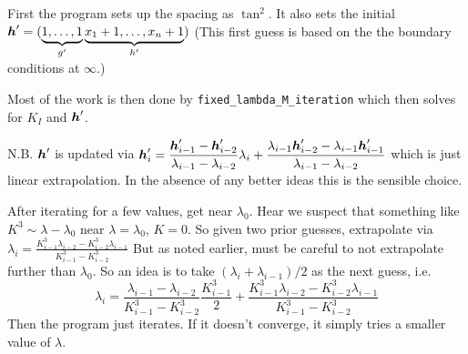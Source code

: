 First the program sets up the spacing as $\tan^2$. It also sets the
initial $\boldsymbol{h}'= (\underbrace{1,\dots,1}_{g'} \underbrace{x_1+1, \dots,
x_n+1}_{h'})$ (This first guess is based on the
the boundary conditions at $\infty$.)

Most of the work is then done by \texttt{fixed\_lambda\_M\_iteration}
which then solves for $K_I$ and $\boldsymbol{h}'$. 

N.B. $\boldsymbol{h}'$ is updated via $\displaystyle \boldsymbol{h}_i' = \frac{\boldsymbol{h}_{i-1}'
-\boldsymbol{h}_{i-2}'}{\lambda_{i-1} - \lambda_{i-2}} \lambda_i + 
\frac{\lambda_{i-1}\boldsymbol{h}_{i-2}'-\lambda_{i-1}\boldsymbol{h}_{i-1}'}
{\lambda_{i-1} - \lambda_{i-2}} $ which is just linear extrapolation.
In the absence of any better ideas this is the sensible choice.

After iterating for a few values, get near $\lambda_0$. Hear we suspect
that something like $K^3 \sim \lambda-\lambda_0$ near $\lambda=\lambda_0$,
$K=0$. So given two prior guesses, extrapolate via 
$\displaystyle \lambda_i = \frac{K_{i-1}^3\lambda_{i-2} - K_{i-2}^3
\lambda_{i-1}}{K_{i-1}^3-K_{i-2}^3}$ But as noted earlier, must be careful
to not extrapolate further than $\lambda_0$. So an idea is to take $(\lambda_i
+ \lambda_{i-1})/2$ as the next guess, i.e. 
\[\lambda_i = 
\frac{\lambda_{i-1} - \lambda_{i-2}}{K_{i-1}^3-K_{i-2}^3}\frac{K_{i-1}^3}{2}
+ \frac{K_{i-1}^3\lambda_{i-2} - K_{i-2}^3 
\lambda_{i-1}}{K_{i-1}^3-K_{i-2}^3} \]
Then the program just iterates. If it doesn't converge, it simply tries a 
smaller value of $\lambda$.
